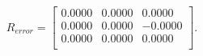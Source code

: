 \begin{equation*}
R_{error} = 
\begin{bmatrix}
  0.0000 &   0.0000 &   0.0000 \\
  0.0000 &   0.0000 &  -0.0000 \\
  0.0000 &   0.0000 &   0.0000 \\
\end{bmatrix}.
\end{equation*}
